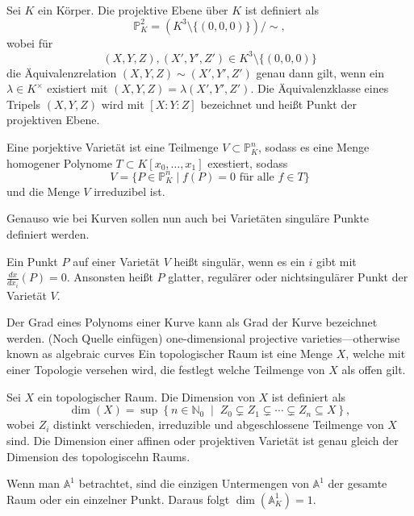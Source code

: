 \begin{definition}
  Sei $K$ ein Körper. Die projektive Ebene über $K$ ist definiert als
  \[
    \mathbb{P}^2_K
    =
    \left(K^3 \setminus \{(0,0,0)\}\right)/\sim,
  \]
  wobei für
  \[
    (X,Y,Z),(X',Y',Z') \in K^3 \setminus \{(0,0,0)\}
  \]
  die Äquivalenzrelation \((X,Y,Z)\sim(X',Y',Z')\) genau dann gilt, wenn ein $\lambda \in K^\times$ existiert mit \((X,Y,Z)=\lambda(X',Y',Z')\).
  Die Äquivalenzklasse eines Tripels $(X,Y,Z)$ wird mit \([X:Y:Z]\) bezeichnet und heißt Punkt der projektiven Ebene.
\end{definition}
\cite[S. 245--246]{Clader25}
\begin{definition}
  Eine porjektive Varietät ist eine Teilmenge $V\subset \mathbb{P}_K^n$, sodass es eine Menge homogener Polynome $T\subset K[x_0,\dots,x_1]$ exestiert, sodass
  \[
    V=\{P\in\mathbb{P}_K^n\mid f(P)=0 \text{ für alle } f\in T\}
  \]
  und die Menge $V$ irreduzibel ist.
\end{definition}
\cite[S.55]{Hulek12}

Genauso wie bei Kurven sollen nun auch bei Varietäten singuläre Punkte definiert werden.
\begin{definition}
  Ein Punkt $P$ auf einer Varietät $V$ heißt singulär, wenn es ein $i$ gibt mit \(\frac{dx}{dx_i}(P)=0\). Ansonsten heißt $P$ glatter, regulärer oder nichtsingulärer Punkt der Varietät $V$.
\end{definition}
Der Grad eines Polynoms einer Kurve kann als Grad der Kurve bezeichnet werden. (Noch Quelle einfügen)
one-dimensional projective varieties—otherwise
known as algebraic curves \cite[S.409]{Clader25}
Ein topologischer Raum ist eine Menge $X$, welche mit einer Topologie versehen wird, die festlegt welche Teilmenge von $X$ als offen gilt.
\begin{definition}[Dimension]
  Sei $X$ ein topologischer Raum. Die Dimension von $X$ ist definiert als
  \[
    \dim(X)=\sup\left\{
    n\in\mathbb{N}_0 \;\middle|\;
    Z_0\subsetneq Z_1\subsetneq\cdots
    \subsetneq Z_n\subseteq X
    \right\},
  \]
  wobei $Z_i$ distinkt verschieden, irreduzible und abgeschlossene Teilmenge von $X$ sind. Die Dimension einer affinen oder projektiven Varietät ist genau gleich der Dimension des topologiscehn Raums.
\end{definition}
Wenn man $\mathbb{A}^1$ betrachtet, sind die einzigen Untermengen von $\mathbb{A}^1$ der gesamte Raum oder ein einzelner Punkt. Daraus folgt \(\dim(\mathbb A_K^1)=1\).
\cite[S.5--6, 10]{Hartshorne7}


